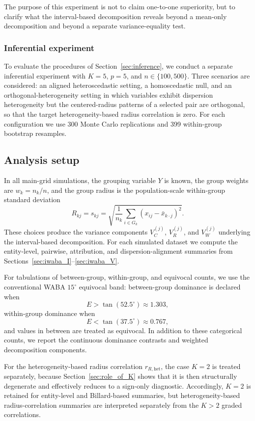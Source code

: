 \documentclass[preprint, times, 12pt, authoryear]{elsarticle}
\begin{document}
The purpose of this experiment is not to claim one-to-one superiority, but to clarify what the interval-based decomposition reveals beyond a mean-only decomposition and beyond a separate variance-equality test.

\subsubsection{Inferential experiment}

To evaluate the procedures of Section~\ref{sec:inference}, we conduct a separate inferential experiment with $K=5$, $p=5$, and $n\in\{100,500\}$. Three scenarios are considered: an aligned heteroscedastic setting, a homoscedastic null, and an orthogonal-heterogeneity setting in which variables exhibit dispersion heterogeneity but the centered-radius patterns of a selected pair are orthogonal, so that the target heterogeneity-based radius correlation is zero. For each configuration we use 300 Monte Carlo replications and 399 within-group bootstrap resamples.

\subsection{Analysis setup}

In all main-grid simulations, the grouping variable $Y$ is known, the group weights are $w_k=n_k/n$, and the group radius is the population-scale within-group standard deviation
\[
R_{kj}=s_{kj}=\sqrt{\frac{1}{n_k}\sum_{i\in G_k}(x_{ij}-\bar x_{k\cdot j})^2}.
\]
These choices produce the variance components $V_C^{(j)}$, $V_R^{(j)}$, and $V_W^{(j)}$ underlying the interval-based decomposition. For each simulated dataset we compute the entity-level, pairwise, attribution, and dispersion-alignment summaries from Sections~\ref{sec:iwaba_I}--\ref{sec:iwaba_V}.

For tabulations of between-group, within-group, and equivocal counts, we use the conventional WABA $15^\circ$ equivocal band: between-group dominance is declared when
\[
E>\tan(52.5^\circ)\approx 1.303,
\]
within-group dominance when
\[
E<\tan(37.5^\circ)\approx 0.767,
\]
and values in between are treated as equivocal. In addition to these categorical counts, we report the continuous dominance contrasts and weighted decomposition components.

For the heterogeneity-based radius correlation $r_{R,\mathrm{het}}$, the case $K=2$ is treated separately, because Section~\ref{sec:role_of_K} shows that it is then structurally degenerate and effectively reduces to a sign-only diagnostic. Accordingly, \(K=2\) is retained for entity-level and Billard-based summaries, but heterogeneity-based radius-correlation summaries are interpreted separately from the \(K>2\) graded correlations.
\end{document}
